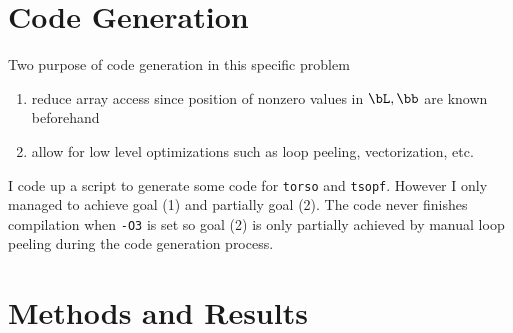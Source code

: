 \documentclass[12pt]{article}
\begin{document}
\section{Code Generation}

Two purpose of code generation in this specific problem
\begin{enumerate}
    \item reduce array access since position of nonzero values in $\bL,\bb$ are known beforehand
    \item allow for low level optimizations such as loop peeling, vectorization, etc.
\end{enumerate}
I code up a script to generate some code for \texttt{torso} and \texttt{tsopf}. However I only managed to achieve goal (1) and partially goal (2). The code never finishes compilation when \texttt{-O3} is set so goal (2) is only partially achieved by manual loop peeling during the code generation process.


\section{Methods and Results}
\end{document}
